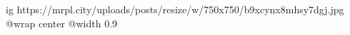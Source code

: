  
 
 
 
 

\ifcmt
  ig https://mrpl.city/uploads/posts/resize/w/750x750/b9xcynx8mhsy7dgj.jpg
  @wrap center
  @width 0.9
\fi
